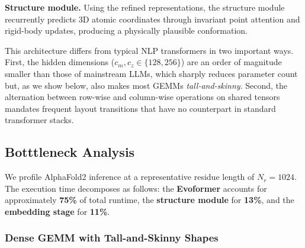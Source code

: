     \textbf{Structure module.} Using the refined representations, the structure module recurrently predicts 3D atomic coordinates through invariant point attention and rigid-body updates, producing a physically plausible conformation.

This architecture differs from typical NLP transformers in two important ways. First, the hidden dimensions ($c_m, c_z \in \{128, 256\}$) are an order of magnitude smaller than those of mainstream LLMs, which sharply reduces parameter count but, as we show below, also makes most GEMMs \textit{tall-and-skinny}. Second, the alternation between row-wise and column-wise operations on shared tensors mandates frequent layout transitions that have no counterpart in standard transformer stacks.

\subsection{Botttleneck Analysis}

We profile AlphaFold2 inference at a representative residue length of $N_r = 1024$. The execution time decomposes as follows: the \textbf{Evoformer} accounts for approximately \textbf{75\%} of total runtime, the \textbf{structure module} for \textbf{13\%}, and the \textbf{embedding stage} for \textbf{11\%}. 


\subsubsection{Dense GEMM with Tall-and-Skinny Shapes}
\label{sec:analysis:shape_dist}

